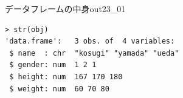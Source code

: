 \begin{Rscreen}{データフレームの中身}{out23_01}
	\begin{verbatim}
> str(obj)
'data.frame':	3 obs. of  4 variables:
 $ name  : chr  "kosugi" "yamada" "ueda"
 $ gender: num  1 2 1
 $ height: num  167 170 180
 $ weight: num  60 70 80
\end{verbatim}
\end{Rscreen}
